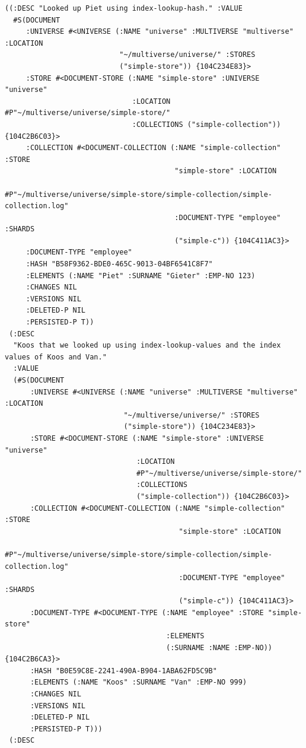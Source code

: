 \documentclass[11pt]{article}
\begin{document}
\begin{verbatim}
((:DESC "Looked up Piet using index-lookup-hash." :VALUE
  #S(DOCUMENT
     :UNIVERSE #<UNIVERSE (:NAME "universe" :MULTIVERSE "multiverse" :LOCATION
                           "~/multiverse/universe/" :STORES
                           ("simple-store")) {104C234E83}>
     :STORE #<DOCUMENT-STORE (:NAME "simple-store" :UNIVERSE "universe"
                              :LOCATION #P"~/multiverse/universe/simple-store/"
                              :COLLECTIONS ("simple-collection")) {104C2B6C03}>
     :COLLECTION #<DOCUMENT-COLLECTION (:NAME "simple-collection" :STORE
                                        "simple-store" :LOCATION
                                        #P"~/multiverse/universe/simple-store/simple-collection/simple-collection.log"
                                        :DOCUMENT-TYPE "employee" :SHARDS
                                        ("simple-c")) {104C411AC3}>
     :DOCUMENT-TYPE "employee"
     :HASH "B58F9362-BDE0-465C-9013-04BF6541C8F7"
     :ELEMENTS (:NAME "Piet" :SURNAME "Gieter" :EMP-NO 123)
     :CHANGES NIL
     :VERSIONS NIL
     :DELETED-P NIL
     :PERSISTED-P T))
 (:DESC
  "Koos that we looked up using index-lookup-values and the index values of Koos and Van."
  :VALUE
  (#S(DOCUMENT
      :UNIVERSE #<UNIVERSE (:NAME "universe" :MULTIVERSE "multiverse" :LOCATION
                            "~/multiverse/universe/" :STORES
                            ("simple-store")) {104C234E83}>
      :STORE #<DOCUMENT-STORE (:NAME "simple-store" :UNIVERSE "universe"
                               :LOCATION
                               #P"~/multiverse/universe/simple-store/"
                               :COLLECTIONS
                               ("simple-collection")) {104C2B6C03}>
      :COLLECTION #<DOCUMENT-COLLECTION (:NAME "simple-collection" :STORE
                                         "simple-store" :LOCATION
                                         #P"~/multiverse/universe/simple-store/simple-collection/simple-collection.log"
                                         :DOCUMENT-TYPE "employee" :SHARDS
                                         ("simple-c")) {104C411AC3}>
      :DOCUMENT-TYPE #<DOCUMENT-TYPE (:NAME "employee" :STORE "simple-store"
                                      :ELEMENTS
                                      (:SURNAME :NAME :EMP-NO)) {104C2B6CA3}>
      :HASH "B0E59C8E-2241-490A-B904-1ABA62FD5C9B"
      :ELEMENTS (:NAME "Koos" :SURNAME "Van" :EMP-NO 999)
      :CHANGES NIL
      :VERSIONS NIL
      :DELETED-P NIL
      :PERSISTED-P T)))
 (:DESC

\end{verbatim}
\end{document}
